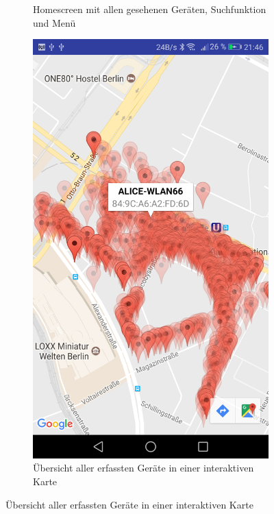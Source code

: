\documentclass[11pt,a4paper]{article}
\begin{document}
\begin{figure}[htbp]
\begin{subfigure}[htbp]{0.26\textwidth}
        \caption{Homescreen mit allen gesehenen Geräten, Suchfunktion und Menü}
        \label{fig:AirSniffer_Home_List}
    \end{subfigure}
    \begin{subfigure}[htbp]{0.26\textwidth}
        \includegraphics[width=\textwidth]{pics/screenshots/AirSniffer_Home_Map.png}
        \caption{Übersicht aller erfassten Geräte in einer interaktiven Karte}
        \label{fig:AirSniffer_Home_Map}
    \end{subfigure}

\end{figure}
\end{document}
